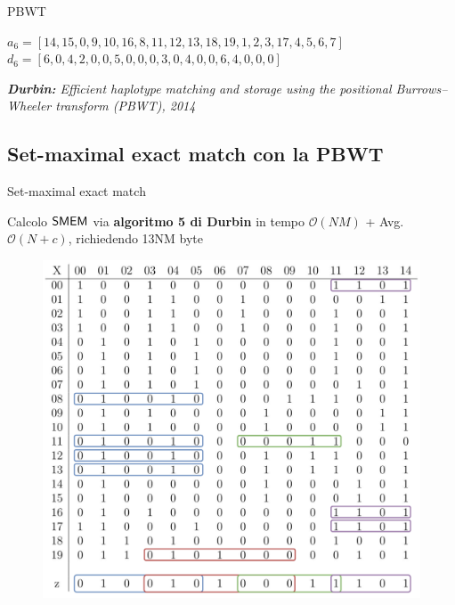 \documentclass[]{beamer}
\def\SMEM{\mbox{\rm {\sf SMEM}}}
\begin{document}
\begin{frame}{PBWT}
\begin{figure}[H]
  \end{figure}
  \vspace{-0.2cm}
  {\scriptsize{
      $a_6=[14,15,0,9,10,16,8,11,12,13,18,19,1,2,3,17,4,5,6,7]$\\
      $d_6=[6,0,4,2,0,0,5,0,0,0,3,0,4,0,0,6,4,0,0,0]$
    }}
  \vspace{-0.1cm}
  \begin{alertblock}{}
    \footnotesize{\textit{\textbf{Durbin:}
        Efficient haplotype matching and storage using the positional
        Burrows--Wheeler transform (PBWT), 2014}}
  \end{alertblock}
\end{frame}
\subsection{Set-maximal exact match con la PBWT}
\begin{frame}{Set-maximal exact match}
  \begin{block}{}
    \small{Calcolo $\SMEM$ via \textbf{algoritmo 5 di
        Durbin} in tempo $\mathcal{O}(NM)$ + Avg.$\mathcal{O}(N+c)$,
      richiedendo 13NM byte}
  \end{block}
  \begin{figure}[H]
    \centering
    \includegraphics[scale = 0.205]{img/pbwtmatch.pdf}
  \end{figure}
  
\end{frame}
\end{document}
